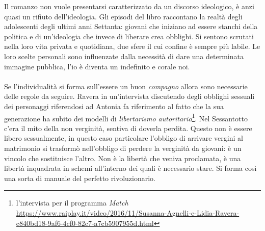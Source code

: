 Il romanzo non vuole presentarsi caratterizzato da un discorso ideologico, è anzi quasi un rifiuto dell'ideologia.
Gli episodi del libro raccontano la realtà degli adolescenti degli ultimi anni Settanta: giovani che iniziano ad essere stanchi della politica e di un'ideologia che invece di liberare crea obblighi.
Si sentono scrutati nella loro vita privata e quotidiana, due sfere il cui confine è sempre più labile.
Le loro scelte personali sono influenzate dalla necessità di dare una determinata immagine pubblica, l’io è diventa un indefinito e corale noi.


\paragraph{}Se l'individualità si forma sull'essere un buon \textit{compagno} allora sono necessarie delle regole da seguire.
Ravera in un'intervista discutendo degli obblighi sessuali dei personaggi riferendosi ad Antonia fa riferimento al fatto che la sua generazione ha subito dei modelli di \textit{libertarismo autoritario}\footnote{l'intervista per il programma \textit{Match} \url{ https://www.raiplay.it/video/2016/11/Susanna-Agnelli-e-Lidia-Ravera-c840bd18-9af6-4cf0-82c7-a7cb5907955d.html}}.
Nel Sessantotto c'era il mito della non verginità, sentiva di doverla perdita.
Questo non è essere libero sessualmente, in questo caso particolare l'obbligo di arrivare vergini al matrimonio si trasformò nell'obbligo di perdere la verginità da giovani: è un vincolo che sostituisce l'altro.
Non è la libertà che veniva proclamata, è una libertà inquadrata in schemi all'interno dei quali è necessario stare.
Si forma così una sorta di manuale del perfetto rivoluzionario.

